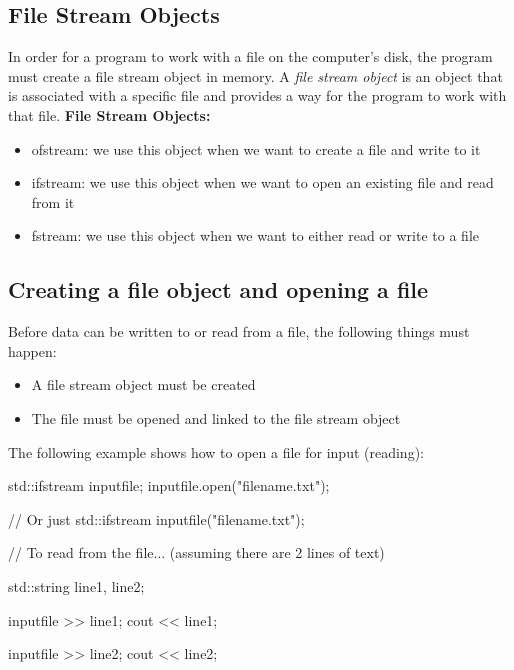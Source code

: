 \documentclass{report}
\begin{document}
    \subsection{File Stream Objects}
    \bigbreak \noindent 
    In order for a program to work with a file on the computer's disk, the program must create a file stream object in memory. A \textit{file stream object} is an object that is associated with a specific file and provides a way for the program to work with that file. 
    \bigbreak \noindent 
    \textbf{File Stream Objects:}
    \begin{itemize}
        \item ofstream: we use this object when we want to create a file and write to it
        \item ifstream: we use this object when we want to open an existing file and read from it
        \item fstream: we use this object when we want to either read or write to a file
    \end{itemize}

    \pagebreak \bigbreak \noindent 
    \subsection{Creating a file object and opening a file}
    \bigbreak \noindent 
    Before data can be written to or read from a file, the following things must happen:
    \begin{itemize}
        \item A file stream object must be created
        \item The file must be opened and linked to the file stream object
    \end{itemize}
    \bigbreak \noindent 
    The following example shows how to open a file for input (reading):
    \bigbreak \noindent 
    
    \begin{cppcode}
std::ifstream inputfile;
inputfile.open("filename.txt");

// Or just
std::ifstream inputfile("filename.txt");

// To read from the file... (assuming there are 2 lines of text)

std::string line1, line2;

inputfile >> line1;
cout << line1;

inputfile >> line2;
cout << line2;
    \end{cppcode}
    
\end{document}
